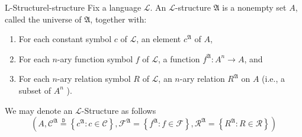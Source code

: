 \begin{definition}{L-Structure}{l-structure}
Fix a language $\mathcal{L}$. An $\mathcal{L}$-structure $\mathfrak{A}$ is a nonempty set $A$, called the universe of $\mathfrak{A}$, together with:
\begin{enumerate}
    \item For each constant symbol $c$ of $\mathcal{L}$, an element $c^{\mathfrak{A}}$ of $A$,
    \item For each $n$-ary function symbol $f$ of $\mathcal{L}$, a function $f^{\mathfrak{A}}: A^{n} \rightarrow A$, and
    \item For each $n$-ary relation symbol $R$ of $\mathcal{L}$, an $n$-ary relation $R^{\mathfrak{A}}$ on $A$ (i.e., a subset of $A^{n}$ ).
\end{enumerate}
We may denote an $\mathcal{L}$-Structure as follows
\[
\left( A, \mathcal{ C } ^{  \mathfrak{ A }   }  \stackrel{\mathtt{D}}{=} \left\{ c ^{ \mathfrak{ A }   } : c \in \mathcal{ C }   \right\}, \mathcal{ F } ^{ \mathfrak{ A }   } = \left\{ f ^{ \mathfrak{ A }   } : f \in  \mathcal{ F }   \right\}, \mathcal{ R } ^{ \mathfrak{ A }   } = \left\{ R ^{ \mathfrak{ A }   } : R \in  \mathcal{ R }   \right\}        \right) 
\]
\end{definition}
